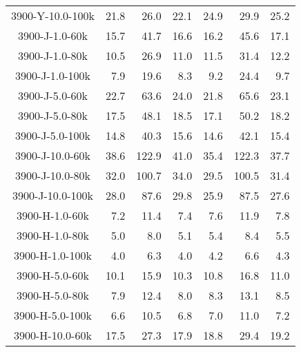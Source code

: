 \begin{longtable}{crrrrrr}
      3900-Y-10.0-100k &        21.8 &        26.0 &        22.1 &           24.9 &           29.9 &           25.2 \\
      3900-J-1.0-60k &        15.7 &        41.7 &        16.6 &           16.2 &           45.6 &           17.1 \\
      3900-J-1.0-80k &        10.5 &        26.9 &        11.0 &           11.5 &           31.4 &           12.2 \\
      3900-J-1.0-100k &         7.9 &        19.6 &         8.3 &            9.2 &           24.4 &            9.7 \\
      3900-J-5.0-60k &        22.7 &        63.6 &        24.0 &           21.8 &           65.6 &           23.1 \\
      3900-J-5.0-80k &        17.5 &        48.1 &        18.5 &           17.1 &           50.2 &           18.2 \\
      3900-J-5.0-100k &        14.8 &        40.3 &        15.6 &           14.6 &           42.1 &           15.4 \\
      3900-J-10.0-60k &        38.6 &       122.9 &        41.0 &           35.4 &          122.3 &           37.7 \\
      3900-J-10.0-80k &        32.0 &       100.7 &        34.0 &           29.5 &          100.5 &           31.4 \\
      3900-J-10.0-100k &        28.0 &        87.6 &        29.8 &           25.9 &           87.5 &           27.6 \\
      3900-H-1.0-60k &         7.2 &        11.4 &         7.4 &            7.6 &           11.9 &            7.8 \\
      3900-H-1.0-80k &         5.0 &         8.0 &         5.1 &            5.4 &            8.4 &            5.5 \\
      3900-H-1.0-100k &         4.0 &         6.3 &         4.0 &            4.2 &            6.6 &            4.3 \\
      3900-H-5.0-60k &        10.1 &        15.9 &        10.3 &           10.8 &           16.8 &           11.0 \\
      3900-H-5.0-80k &         7.9 &        12.4 &         8.0 &            8.3 &           13.1 &            8.5 \\
      3900-H-5.0-100k &         6.6 &        10.5 &         6.8 &            7.0 &           11.0 &            7.2 \\
      3900-H-10.0-60k &        17.5 &        27.3 &        17.9 &           18.8 &           29.4 &           19.2 \\

\end{longtable}
